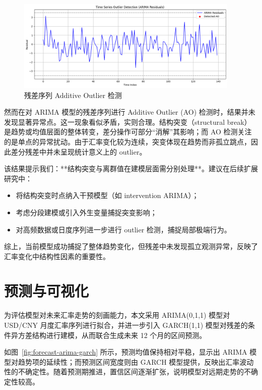 \documentclass[11pt,a4paper]{article}
\begin{document}
\begin{figure}[H]
  \centering
  \includegraphics[width=0.95\textwidth]{./figures/rupture_break.png}
  \caption{残差序列 Additive Outlier 检测}
  \label{fig:rupture-breaks}
\end{figure}

然而在对 ARIMA 模型的残差序列进行 Additive Outlier (AO) 检测时，结果并未发现显著异常点。这一现象看似矛盾，实则合理。结构突变（structural break）是趋势或均值层面的整体转变，差分操作可部分“消解”其影响；而 AO 检测关注的是单点的异常扰动。由于汇率变化较为连续，突变体现在趋势而非孤立跳点，因此差分残差中并未呈现统计意义上的 outlier。

该结果提示我们：**结构突变与离群值在建模层面需分别处理**。建议在后续扩展研究中：
\begin{itemize}
  \item 将结构突变时点纳入干预模型（如 intervention ARIMA）；
  \item 考虑分段建模或引入外生变量捕捉突变影响；
  \item 对高频数据或日度序列进一步进行 outlier 检测，捕捉局部极端行为。
\end{itemize}

综上，当前模型成功捕捉了整体趋势变化，但残差中未发现孤立观测异常，反映了汇率变化中结构性因素的重要性。






\section{预测与可视化}

为评估模型对未来汇率走势的刻画能力，本文采用 ARIMA(0,1,1) 模型对 USD/CNY 月度汇率序列进行拟合，并进一步引入 GARCH(1,1) 模型对残差的条件异方差结构进行建模，从而联合生成未来 12 个月的区间预测。

如图~\ref{fig:forecast-arima-garch} 所示，预测均值保持相对平稳，显示出 ARIMA 模型对趋势项的延续性；而预测区间宽度则由 GARCH 模型提供，反映出汇率波动性的不确定性。随着预测期推进，置信区间逐渐扩张，说明模型对远期走势的不确定性较高。
\end{document}

